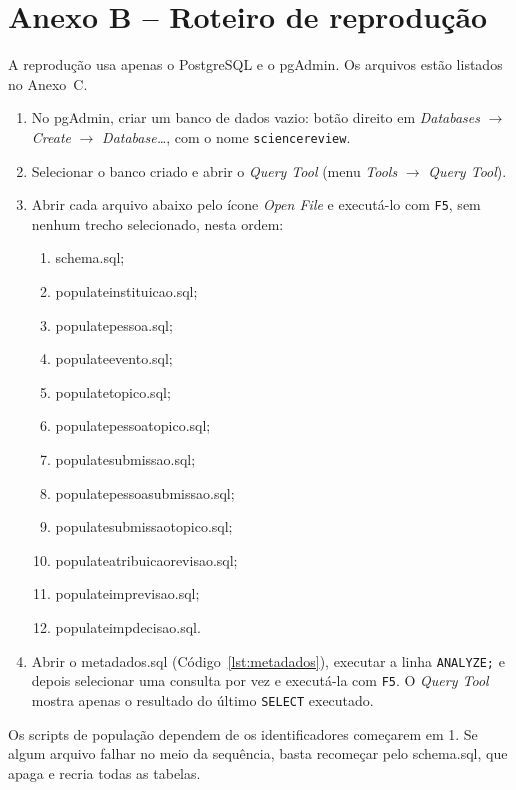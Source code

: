 \documentclass[12pt,a4paper]{article}
\newcommand{\tbus}{\textunderscore\allowbreak}
\newcommand{\tb}[1]{{\ttfamily\let\_\tbus #1}}
\begin{document}
\section*{Anexo B -- Roteiro de reprodução}
A reprodução usa apenas o PostgreSQL e o pgAdmin. Os arquivos estão listados no
Anexo~C.
\begin{enumerate}
    \item No pgAdmin, criar um banco de dados vazio: botão direito em
    \textit{Databases} \(\rightarrow\) \textit{Create} \(\rightarrow\)
    \textit{Database\dots}, com o nome \texttt{sciencereview}.
    \item Selecionar o banco criado e abrir o \textit{Query Tool}
    (menu \textit{Tools} \(\rightarrow\) \textit{Query Tool}).
    \item Abrir cada arquivo abaixo pelo ícone \textit{Open File} e executá-lo com
    \texttt{F5}, sem nenhum trecho selecionado, nesta ordem:
    \begin{enumerate}
        \item \tb{schema.sql};
        \item \tb{populate\_instituicao.sql};
        \item \tb{populate\_pessoa.sql};
        \item \tb{populate\_evento.sql};
        \item \tb{populate\_topico.sql};
        \item \tb{populate\_pessoa\_topico.sql};
        \item \tb{populate\_submissao.sql};
        \item \tb{populate\_pessoa\_submissao.sql};
        \item \tb{populate\_submissao\_topico.sql};
        \item \tb{populate\_atribuicao\_revisao.sql};
        \item \tb{populate\_imp\_revisao.sql};
        \item \tb{populate\_imp\_decisao.sql}.
    \end{enumerate}
    \item Abrir o \tb{metadados.sql} (Código~\ref{lst:metadados}), executar a linha
    \texttt{ANALYZE;} e depois selecionar uma consulta por vez e executá-la com
    \texttt{F5}. O \textit{Query Tool} mostra apenas o resultado do último
    \texttt{SELECT} executado.
\end{enumerate}

Os scripts de população dependem de os identificadores começarem em 1. Se algum
arquivo falhar no meio da sequência, basta recomeçar pelo \tb{schema.sql}, que apaga e
recria todas as tabelas.
\end{document}
